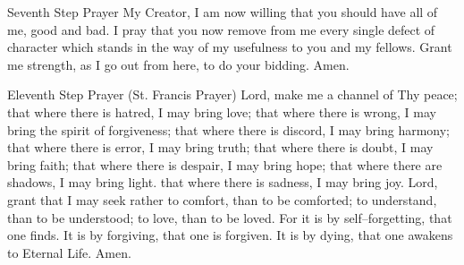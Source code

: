 \documentclass{beamer}
\begin{document}
                \begin{frame}[plain]\LARGE
        \begin{alertblock}{Seventh Step Prayer}
My Creator, I am now willing that you should have all of me, good and bad. I pray that you now remove from me every single defect of character which stands in the way of my usefulness to you and my fellows. Grant me strength, as I go out from here, to do your bidding.  Amen.
\end{alertblock}
    \end{frame}
    
                    \begin{frame}[plain]\large
        \begin{alertblock}{Eleventh Step Prayer (St. Francis Prayer)}
    Lord, make me a channel of Thy peace; that where there is hatred, I may bring love; that where there is wrong, I may bring the spirit of forgiveness; that where there is discord, I may bring harmony; that where there is error, I may bring truth; that where there is doubt, I may bring faith; that where there is despair, I may bring hope; that where there are shadows, I may bring light. that where there is sadness, I may bring joy. Lord, grant that I may seek rather to comfort, than to be comforted; to understand, than to be understood; to love, than to be loved.  For it is by self--forgetting, that one finds. It is by forgiving, that one is forgiven. It is by dying, that one awakens to Eternal Life. Amen.
\end{alertblock}
    \end{frame}
    
\end{document}
